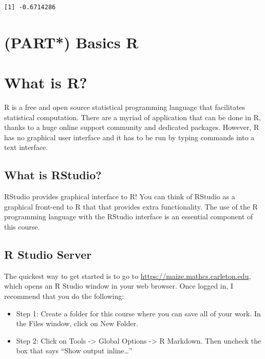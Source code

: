\documentclass[
]{book}
\providecommand{\tightlist}{%
  \setlength{\itemsep}{0pt}\setlength{\parskip}{0pt}}
\begin{document}
\begin{verbatim}
[1] -0.6714286
\end{verbatim}

\hypertarget{part-basics-r}{%
\chapter{(PART*) Basics R}\label{part-basics-r}}

\hypertarget{what-is-r}{%
\chapter{What is R?}\label{what-is-r}}

R is a free and open source statistical programming language that facilitates statistical computation. There are a myriad of application that can be done in R, thanks to a huge online support community and dedicated packages. However, R has no graphical user interface and it has to be run by typing commands into a text interface.

\hypertarget{what-is-rstudio}{%
\section{What is RStudio?}\label{what-is-rstudio}}

RStudio provides graphical interface to R! You can think of RStudio as a graphical front-end to R that that provides extra functionality. The use of the R programming language with the RStudio interface is an essential component of this course.

\hypertarget{r-studio-server}{%
\section{R Studio Server}\label{r-studio-server}}

The quickest way to get started is to go to \url{https://maize.mathcs.carleton.edu}, which opens an R Studio window in your web browser. Once logged in, I recommend that you do the following:

\begin{itemize}
\tightlist
\item
  Step 1: Create a folder for this course where you can save all of your work. In the Files window, click on New Folder.
\item
  Step 2: Click on Tools -\textgreater{} Global Options -\textgreater{} R Markdown. Then uncheck the box that says ``Show output inline\ldots{}''
\end{itemize}
\end{document}
